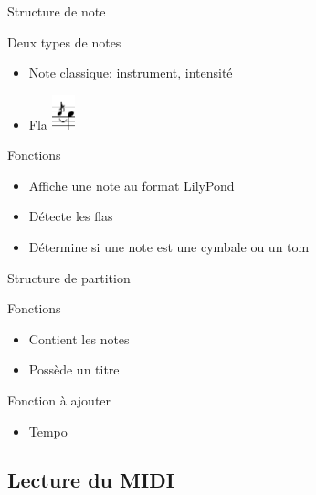 \documentclass{beamer}
\begin{document}
\begin{frame}{Structure de note}
    \begin{block}{Deux types de notes}
        \begin{itemize}
            \item Note classique: instrument, intensité
            \item Fla
            \includegraphics[height=1cm]{figures/fla.pdf}
        \end{itemize}
    \end{block}
    \begin{block}{Fonctions}
        \begin{itemize}
            \item Affiche une note au format LilyPond
            \item Détecte les flas
            \item Détermine si une note est une cymbale ou un tom
        \end{itemize}
    \end{block}
\end{frame}

\begin{frame}{Structure de partition}
    \begin{block}{Fonctions}
        \begin{itemize}
            \item Contient les notes
            \item Possède un titre
        \end{itemize}
    \end{block}
    \begin{block}{Fonction à ajouter}
        \begin{itemize}
            \item Tempo
        \end{itemize}
    \end{block}
\end{frame}

\subsection{Lecture du MIDI}
\end{document}
